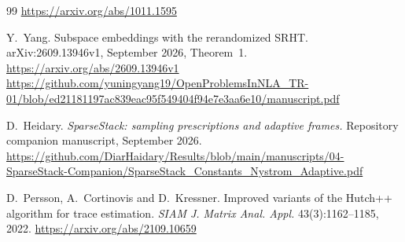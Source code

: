 \documentclass[11pt,a4paper]{article}
\theoremstyle{definition}
\theoremstyle{remark}
\numberwithin{equation}{section}
\begin{document}
\begin{thebibliography}{99}
\newblock \url{https://arxiv.org/abs/1011.1595}

Y.~Yang.
\newblock Subspace embeddings with the rerandomized SRHT.
\newblock arXiv:2609.13946v1, September 2026, Theorem~1.
\newblock \url{https://arxiv.org/abs/2609.13946v1}
\newblock \url{https://github.com/yuningyang19/OpenProblemsInNLA_TR-01/blob/ed21181197ac839eac95f549404f94e7e3aa6e10/manuscript.pdf}

D.~Heidary.
\newblock \emph{SparseStack: sampling prescriptions and adaptive frames.}
\newblock Repository companion manuscript, September 2026.
\newblock \url{https://github.com/DiarHaidary/Results/blob/main/manuscripts/04-SparseStack-Companion/SparseStack_Constants_Nystrom_Adaptive.pdf}

D.~Persson, A.~Cortinovis and D.~Kressner.
\newblock Improved variants of the Hutch++ algorithm for trace estimation.
\newblock \emph{SIAM J. Matrix Anal. Appl.} 43(3):1162--1185, 2022.
\newblock \url{https://arxiv.org/abs/2109.10659}

\end{thebibliography}
\end{document}
